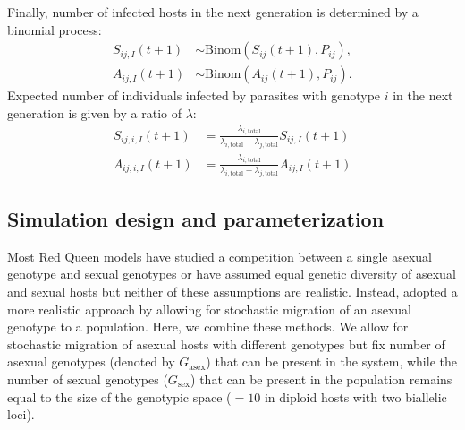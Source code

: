 \documentclass{article}\usepackage[]{graphicx}\usepackage[]{color}
\begin{document}
Finally, number of infected hosts in the next generation is determined by a binomial process:
\begin{equation}
\begin{aligned}
S_{ij,I} (t+1) &\sim \mathrm{Binom}(S_{ij} (t+1), P_{ij}),\\
A_{ij,I} (t+1) &\sim \mathrm{Binom}(A_{ij} (t+1), P_{ij}).
\end{aligned}
\end{equation}
Expected number of individuals infected by parasites with genotype $i$ in the next generation is given by a ratio of $\lambda$:
\begin{equation}
\begin{aligned}
S_{ij,i,I}(t+1) &= \frac{\lambda_{i, \textrm{total}}}{\lambda_{i, \textrm{total}} + \lambda_{j, \textrm{total}}} S_{ij,I}(t+1)\\
A_{ij,i,I}(t+1) &= \frac{\lambda_{i, \textrm{total}}}{\lambda_{i, \textrm{total}} + \lambda_{j, \textrm{total}}} A_{ij,I}(t+1)
\end{aligned}
\end{equation}

\subsection{Simulation design and parameterization}

Most Red Queen models have studied a competition between a single asexual genotype and sexual genotypes or have assumed equal genetic diversity of asexual and sexual hosts \citep{ashby2015diversity} but neither of these assumptions are realistic.
Instead, \cite{ashby2015diversity} adopted a more realistic approach by allowing for stochastic migration of an asexual genotype to a population.
Here, we combine these methods.
We allow for stochastic migration of asexual hosts with different genotypes but fix number of asexual genotypes (denoted by $G_{\textrm{asex}}$) that can be present in the system, 
while the number of sexual genotypes ($G_{\textrm{sex}}$) that can be present in the population remains equal to the size of the genotypic space ($=10$ in diploid hosts with two biallelic loci).
\end{document}
